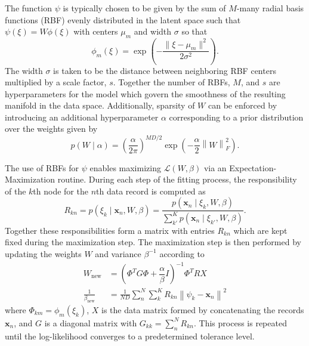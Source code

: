 \documentclass[remotesensing,article,submit,pdftex,moreauthors]{Definitions/mdpi}
\begin{document}
The function $\psi$ is typically chosen to be given by the sum of $M$-many radial basis functions (RBF) evenly distributed in the latent space such that $\psi(\xi) = W\phi(\xi)$ with centers $\mu_m$ and width $\sigma$ so that
\begin{equation}
    \phi_m(\xi) = \exp\left(-\dfrac{\lVert \xi - \mu_m \rVert^2}{2\sigma^2}\right).
\end{equation}
The width $\sigma$ is taken to be the distance between neighboring RBF centers multiplied by a scale factor, $s$. Together the number of RBFs, $M$, and $s$ are hyperparameters for the model which govern the smoothness of the resulting manifold in the data space. Additionally, sparsity of $W$ can be enforced by introducing an additional hyperparameter $\alpha$ corresponding to a prior distribution over the weights given by
\begin{equation}\label{eq:weight-prior}
    p(W \mid \alpha) =  \left( \frac{\alpha}{2\pi} \right)^{MD/2}\exp\left(-\frac{\alpha}{2}\left\lVert W \right\rVert_{F}^2\right).
\end{equation}

The use of RBFs for $\psi$ enables maximizing $\mathcal{L}(W,\beta)$ via an Expectation-Maximization routine. During each step of the fitting process, the responsibility of the $k$th node for the $n$th data record is computed as 
\begin{equation}\label{eq:responsibility}
    R_{kn} = p(\xi_k \mid \mathbf{x}_n, W, \beta) = \dfrac{p(\mathbf{x}_n \mid \xi_k, W, \beta)}{\sum\limits_{k'}^{K} p(\mathbf{x}_n \mid \xi_{k'}, W, \beta)}.
\end{equation}
Together these responsibilities form a matrix with entries $R_{kn}$ which are kept fixed during the maximization step. The maximization step is then performed by updating the weights $W$ and variance $\beta^{-1}$ according to
\begin{align}\label{eq:m-step}
    W_{\text{new}} &= \left(\Phi^T G \Phi + \dfrac{\alpha}{\beta}I \right)^{-1} \Phi^T R X  \\
    \frac{1}{\beta_{\text{new}}} &= \frac{1}{ND} \sum\limits_{n}^{N} \sum\limits_{k}^{K} R_{kn} \left\lVert \psi_k - \mathbf{x}_n \right\rVert^2
\end{align}
where $\Phi_{km} = \phi_m(\xi_k)$, $X$ is the data matrix formed by concatenating the records $\mathbf{x}_n$, and $G$ is a diagonal matrix with $G_{kk} = \sum\limits_n^N R_{kn}$. This process is repeated until the log-likelihood converges to a predetermined tolerance level.
\end{document}
